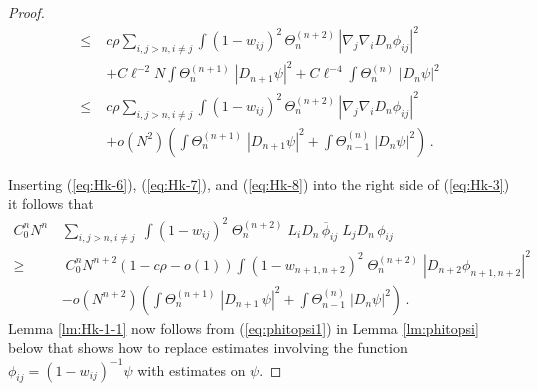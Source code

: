 \documentclass[11pt]{article}
\begin{document}
\begin{proof}
\begin{equation}
\begin{split}
\leq \; &c \rho \sum_{i,j >n, i \neq j} \int (1-w_{ij})^2 \,
\Theta^{(n+2)}_n \, |\nabla_j \nabla_i D_n \phi_{ij}|^2 \\ &+ C
\ell^{-2} N \int \Theta^{(n+1)}_n \; | D_{n+1} \psi|^2 + C \ell^{-4}
\int \Theta_n^{(n)} \; |D_n \psi|^2
\\ \leq \; &c \rho \sum_{i,j >n, i \neq j} \int (1-w_{ij})^2
\, \Theta^{(n+2)}_n \, |\nabla_j \nabla_i D_n \phi_{ij}|^2 \\ &+
o(N^2) \left( \int \Theta^{(n+1)}_n \; | D_{n+1} \psi|^2 + \int
\Theta_{n-1}^{(n)} \; | D_n \psi|^2 \right)\,.
\end{split}
\end{equation}

\medskip

Inserting (\ref{eq:Hk-6}), (\ref{eq:Hk-7}), and (\ref{eq:Hk-8}) into
the right side of (\ref{eq:Hk-3}) it follows that
\begin{equation}\label{eq:Hk-9}
\begin{split}
C_0^n N^n \, &\sum_{i,j > n, i\neq j} \; \int (1-w_{ij})^2 \;
\Theta^{(n+2)}_n \; L_i D_n \,\overline{\phi}_{ij} \; L_j D_n \,
\phi_{ij}
\\ \geq & \; C_0^n N^{n+2}(1- c\rho - o(1)) \int (1-w_{n+1,n+2})^2
\; \Theta^{(n+2)}_n \;
|D_{n+2} \phi_{n+1,n+2}|^2 \\
&-o(N^{n+2}) \left( \int \Theta^{(n+1)}_{n} \; |D_{n+1} \, \psi|^2 +
\int \Theta_{n-1}^{(n)} \; |D_n \psi|^2 \right)\,.
\end{split}
\end{equation}
Lemma \ref{lm:Hk-1-1} now follows from (\ref{eq:phitopsi1}) in Lemma
\ref{lm:phitopsi} below that shows how to replace estimates
involving the function $\phi_{ij}=(1-w_{ij})^{-1}\psi$ with
estimates on $\psi$.
\end{proof}
\end{document}

